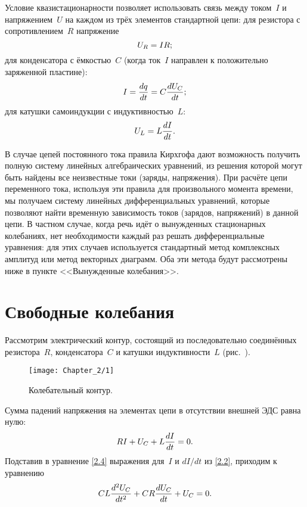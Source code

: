 Условие квазистационарности позволяет использовать связь между током~$I$ и
напряжением~$U$ на каждом из трёх элементов стандартной цепи:
для резистора с сопротивлением~$R$ напряжение
\begin{equation}
	\eqmark{2.1}
	U_R=IR;
\end{equation}
для конденсатора с ёмкостью~$C$ (когда ток~$I$ направлен к положительно
заряженной пластине):
\begin{equation}
	\eqmark{2.2}
	I=\dfrac{dq}{dt}=C\dfrac{dU_C}{dt};
\end{equation}
для катушки самоиндукции с индуктивностью~$L$:
\begin{equation}
	\eqmark{2.3}
	U_L=L\dfrac{dI}{dt}.
\end{equation}

В случае цепей постоянного тока правила Кирхгофа дают возможность получить
полную систему линейных алгебраических уравнений, из решения которой могут быть
найдены все неизвестные токи (заряды, напряжения). При расчёте цепи переменного
тока, используя эти правила для произвольного момента времени, мы получаем
систему линейных дифференциальных уравнений, которые позволяют найти временную
зависимость токов (зарядов, напряжений) в данной цепи. В частном случае, когда
речь идёт о вынужденных стационарных колебаниях, нет необходимости каждый раз
решать дифференциальные уравнения: для этих случаев используется стандартный
метод комплексных амплитуд или метод векторных диаграмм. Оба эти метода будут
рассмотрены ниже в пункте <<Вынужденные колебания>>.

\section{Свободные колебания}

Рассмотрим электрический контур, состоящий из последовательно соединённых
резистора~$R$, конденсатора~$C$ и катушки индуктивности~$L$
(рис.~).

\begin{figure}[h!]
	\centering\texttt{[image: Chapter\_2/1]}
	\caption{Колебательный контур.}
\end{figure}


Сумма падений напряжения на элементах цепи в отсутствии внешней ЭДС равна нулю:
\begin{equation}
	\eqmark{2.4}
	RI+U_C+L\dfrac{dI}{dt}=0.
\end{equation}
Подставив в уравнение \eqref{2.4} выражения для~$I$ и $dI/dt$ из \eqref{2.2},
приходим к уравнению
\begin{equation}
	\eqmark{2.5}
	CL\dfrac{d^2U_C}{dt^2}+CR\dfrac{dU_C}{dt}+U_C=0.
\end{equation}

